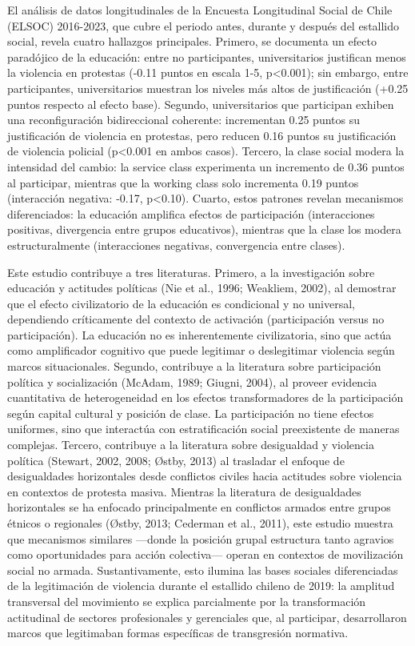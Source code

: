 \documentclass[
  12pt,
]{article}
\begin{document}
El análisis de datos longitudinales de la Encuesta Longitudinal Social
de Chile (ELSOC) 2016-2023, que cubre el periodo antes, durante y
después del estallido social, revela cuatro hallazgos principales.
Primero, se documenta un efecto paradójico de la educación: entre no
participantes, universitarios justifican menos la violencia en protestas
(-0.11 puntos en escala 1-5, p\textless0.001); sin embargo, entre
participantes, universitarios muestran los niveles más altos de
justificación (+0.25 puntos respecto al efecto base). Segundo,
universitarios que participan exhiben una reconfiguración bidireccional
coherente: incrementan 0.25 puntos su justificación de violencia en
protestas, pero reducen 0.16 puntos su justificación de violencia
policial (p\textless0.001 en ambos casos). Tercero, la clase social
modera la intensidad del cambio: la service class experimenta un
incremento de 0.36 puntos al participar, mientras que la working class
solo incrementa 0.19 puntos (interacción negativa: -0.17,
p\textless0.10). Cuarto, estos patrones revelan mecanismos
diferenciados: la educación amplifica efectos de participación
(interacciones positivas, divergencia entre grupos educativos), mientras
que la clase los modera estructuralmente (interacciones negativas,
convergencia entre clases).

Este estudio contribuye a tres literaturas. Primero, a la investigación
sobre educación y actitudes políticas (Nie et al., 1996; Weakliem,
2002), al demostrar que el efecto civilizatorio de la educación es
condicional y no universal, dependiendo críticamente del contexto de
activación (participación versus no participación). La educación no es
inherentemente civilizatoria, sino que actúa como amplificador cognitivo
que puede legitimar o deslegitimar violencia según marcos situacionales.
Segundo, contribuye a la literatura sobre participación política y
socialización (McAdam, 1989; Giugni, 2004), al proveer evidencia
cuantitativa de heterogeneidad en los efectos transformadores de la
participación según capital cultural y posición de clase. La
participación no tiene efectos uniformes, sino que interactúa con
estratificación social preexistente de maneras complejas. Tercero,
contribuye a la literatura sobre desigualdad y violencia política
(Stewart, 2002, 2008; Østby, 2013) al trasladar el enfoque de
desigualdades horizontales desde conflictos civiles hacia actitudes
sobre violencia en contextos de protesta masiva. Mientras la literatura
de desigualdades horizontales se ha enfocado principalmente en
conflictos armados entre grupos étnicos o regionales (Østby, 2013;
Cederman et al., 2011), este estudio muestra que mecanismos similares
---donde la posición grupal estructura tanto agravios como oportunidades
para acción colectiva--- operan en contextos de movilización social no
armada. Sustantivamente, esto ilumina las bases sociales diferenciadas
de la legitimación de violencia durante el estallido chileno de 2019: la
amplitud transversal del movimiento se explica parcialmente por la
transformación actitudinal de sectores profesionales y gerenciales que,
al participar, desarrollaron marcos que legitimaban formas específicas
de transgresión normativa.
\end{document}
